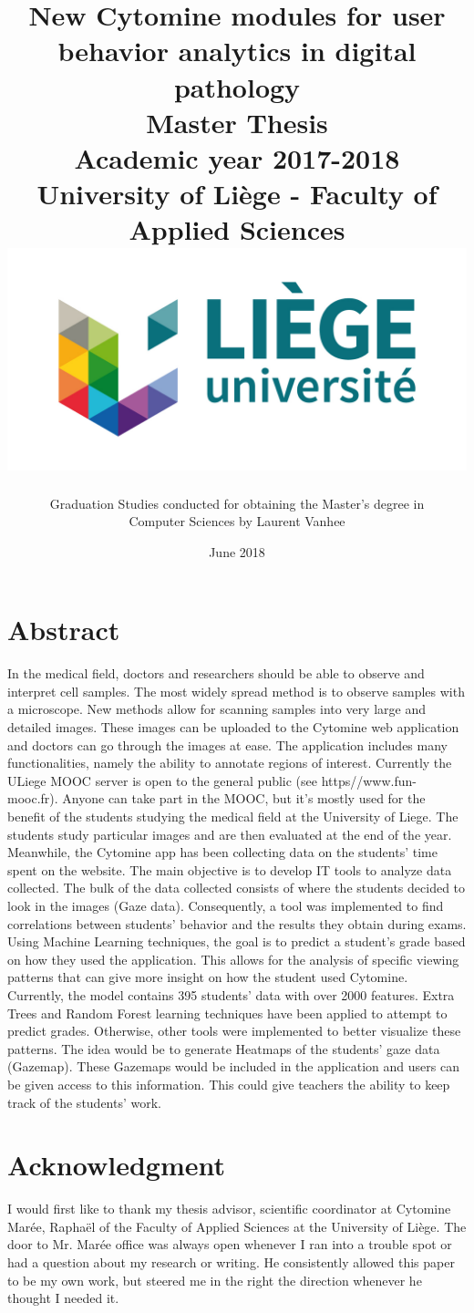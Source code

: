 \documentclass[a4paper,11pt]{report}
\title{
\LARGE
\textbf{New Cytomine modules for user behavior analytics in digital pathology}\\
\vspace{1cm}
Master Thesis\\
\vspace{0.3cm}
Academic year 2017-2018\\
University of Li\`{e}ge - Faculty of Applied Sciences\\
\vspace{3cm}
\includegraphics[scale=0.75]{images/logo.jpg}
\vspace{2cm}
}
\author{ Graduation Studies conducted for obtaining the Master's degree in \\Computer Sciences by Laurent Vanhee}
\date{June 2018}
\numberwithin{figure}{chapter} %
\begin{document}
\pagestyle{empty}
\maketitle
\pagestyle{fancy}
\fancyhf{}
\tableofcontents


\newpage
\chapter*{Abstract}
In the medical field, doctors and researchers should be able to observe and interpret cell samples.
The
most widely spread method is to observe samples with a microscope.
New methods allow for scanning
samples into very large and detailed images.
These images can be uploaded to the Cytomine web
application and doctors can go through the images at ease.
The application includes many
functionalities, namely the ability to annotate regions of interest.
Currently the ULiege MOOC server is open to the general public (see https//www.fun-mooc.fr).
Anyone can take part in the MOOC, but it's mostly used for the benefit of the students studying the medical field at the University of Liege.
The students
study particular images and are then evaluated at the end of the year.
Meanwhile, the Cytomine app
has been collecting data on the students' time spent on the website.
The main objective is to develop IT tools to analyze data collected.
The bulk of the data collected
consists of where the students decided to look in the images (Gaze data).
Consequently, a tool was implemented to find correlations between students' behavior and the results they obtain during exams.
Using Machine
Learning techniques, the goal is to predict a student's grade based on how they used the application.
This allows for the analysis of specific viewing patterns that can give more insight on how the student used Cytomine.
Currently, the model contains 395 students' data with over 2000 features.
Extra Trees and Random Forest
learning techniques have been applied to attempt to predict grades.
Otherwise, other tools were implemented to better
visualize these patterns.
The idea would be to generate Heatmaps of the students' gaze data (Gazemap).
These Gazemaps would be included in the application and users can be given access to this information.
This
could give teachers the ability to keep track of the students' work.

\chapter*{Acknowledgment}
I would first like to thank my thesis advisor, scientific coordinator at Cytomine Mar\'{e}e, Rapha\"{e}l of the Faculty of Applied Sciences at the University of Li\`{e}ge.
The door to Mr. Mar\'{e}e office was always open whenever I ran into a trouble spot or had a question about my research or writing.
He consistently allowed this paper to be my own work, but steered me in the right the direction whenever he thought I needed it.\\
\end{document}
